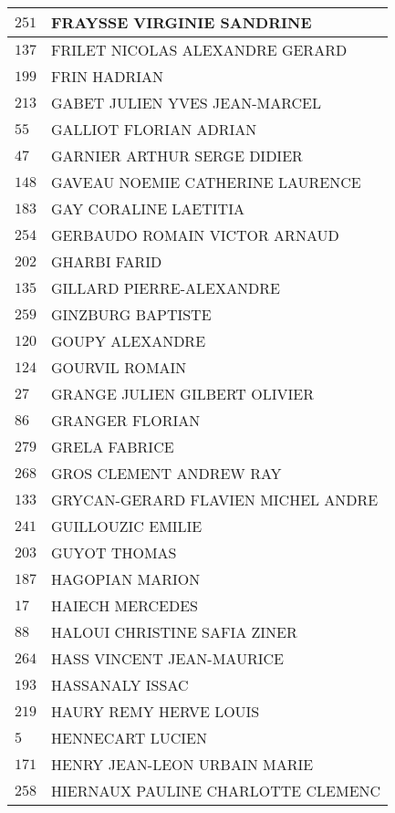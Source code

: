 \begin{xltabular}{\linewidth}{|l|X|}
    \hline
    $251$ & FRAYSSE VIRGINIE SANDRINE \\
    \hline
    $137$ & FRILET NICOLAS ALEXANDRE GERARD \\
    \hline
    $199$ & FRIN HADRIAN \\
    \hline
    $213$ & GABET JULIEN YVES JEAN-MARCEL \\
    \hline
    $55$ & GALLIOT FLORIAN ADRIAN \\
    \hline
    $47$ & GARNIER ARTHUR SERGE DIDIER \\
    \hline
    $148$ & GAVEAU NOEMIE CATHERINE LAURENCE \\
    \hline
    $183$ & GAY CORALINE LAETITIA \\
    \hline
    $254$ & GERBAUDO ROMAIN VICTOR ARNAUD \\
    \hline
    $202$ & GHARBI FARID \\
    \hline
    $135$ & GILLARD PIERRE-ALEXANDRE \\
    \hline
    $259$ & GINZBURG BAPTISTE \\
    \hline
    $120$ & GOUPY ALEXANDRE \\
    \hline
    $124$ & GOURVIL ROMAIN \\
    \hline
    $27$ & GRANGE JULIEN GILBERT OLIVIER \\
    \hline
    $86$ & GRANGER FLORIAN \\
    \hline
    $279$ & GRELA FABRICE \\
    \hline
    $268$ & GROS CLEMENT ANDREW RAY \\
    \hline
    $133$ & GRYCAN-GERARD FLAVIEN MICHEL ANDRE \\
    \hline
    $241$ & GUILLOUZIC EMILIE \\
    \hline
    $203$ & GUYOT THOMAS \\
    \hline
    $187$ & HAGOPIAN MARION \\
    \hline
    $17$ & HAIECH MERCEDES \\
    \hline
    $88$ & HALOUI CHRISTINE SAFIA ZINER \\
    \hline
    $264$ & HASS VINCENT JEAN-MAURICE \\
    \hline
    $193$ & HASSANALY ISSAC \\
    \hline
    $219$ & HAURY REMY HERVE LOUIS \\
    \hline
    $5$ & HENNECART LUCIEN \\
    \hline
    $171$ & HENRY JEAN-LEON URBAIN MARIE \\
    \hline
    $258$ & HIERNAUX PAULINE CHARLOTTE CLEMENC \\

\end{xltabular}
